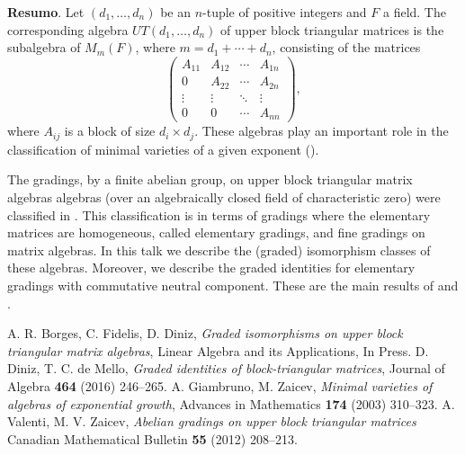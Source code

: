 	\vspace{24pt}



	\noindent\textbf{Resumo}.\label{ddpss} 
	Let $(d_1,\dots, d_n)$ be an $n$-tuple of positive integers and $F$ a field. The corresponding algebra $UT(d_1,\dots,d_n)$ of upper block triangular matrices is the subalgebra of $M_{m}(F)$, where $m=d_1+\cdots+d_n$, consisting of the matrices \[
\left(\begin{array}{cccc}
A_{11} & A_{12} & \cdots & A_{1n}\\
0 & A_{22}&\cdots & A_{2n}\\
\vdots & \vdots & \ddots & \vdots \\
0&0&\cdots& A_{nn}
\end{array}\right),
\] 
	where $A_{ij}$ is a block of size $d_i\times d_j$. These algebras play an important role in the classification of minimal varieties of a given exponent (\cite{GZ}). 

	The gradings, by a finite abelian group, on upper block triangular matrix algebras algebras (over an algebraically closed field of characteristic zero) were classified in \cite{VZ}. This classification is in terms of gradings where the elementary matrices are homogeneous, called elementary gradings, and fine gradings on matrix algebras. In this talk we describe the (graded) isomorphism classes of these algebras. Moreover, we describe the graded identities for elementary gradings with commutative neutral component. These are the main results of  \cite{BFD} and \cite{DM}.


\begin{thebibliography}{999}
	 A. R. Borges, C. Fidelis, D. Diniz, \textit{Graded isomorphisms on upper block triangular matrix algebras}, Linear Algebra and its Applications, In Press.
	 D. Diniz, T. C. de Mello, \textit{Graded identities of block-triangular matrices}, Journal of Algebra \textbf{464} (2016) 246--265.
	 A. Giambruno, M. Zaicev, \textit{Minimal varieties of algebras of
		exponential growth}, Advances in Mathematics \textbf{174} (2003) 310--323.
	 A. Valenti, M. V. Zaicev, \textit{Abelian gradings on upper block triangular matrices} Canadian Mathematical Bulletin \textbf{55} (2012) 208--213.
\end{thebibliography}

